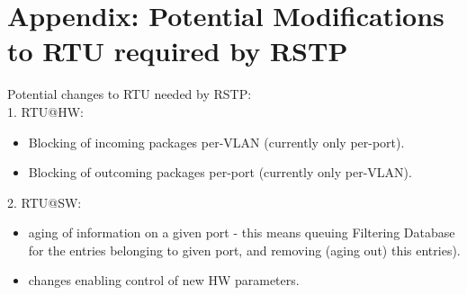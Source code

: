 \chapter{Appendix: Potential Modifications to RTU required by RSTP}
\label{appE}

Potential changes to RTU needed by RSTP: \\
1. RTU@HW:
\begin{itemize}
  \item Blocking of incoming packages per-VLAN (currently only per-port).
  \item Blocking of outcoming packages per-port (currently only per-VLAN).
\end{itemize}
2. RTU@SW:
\begin{itemize}
  \item aging of information on a given port - this means queuing Filtering
Database for the entries belonging to given port, and removing (aging out) this
entries).
  \item changes enabling control of new HW parameters.
\end{itemize}